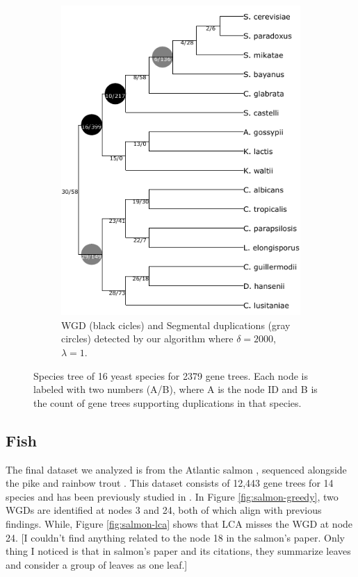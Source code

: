 \documentclass[10pt]{article}
\newcommand{\rk}[1]{\begingroup\color{red}#1\endgroup}
\begin{document}
\begin{figure}[h!]
\begin{subfigure}[b]{0.48\textwidth}
        \includegraphics[scale=0.7]{figs/fungi_greedy2000.pdf} %
        \caption{WGD (black cicles) and Segmental duplications (gray circles) detected by our algorithm where $\delta=2000$, $\lambda=1$.}
        \label{fig:fungi-greedy}
    \end{subfigure}
    
    \caption{
        Species tree of 16 yeast species for 2379 gene trees. Each node is labeled with two numbers (A/B), where A is the node ID and B is the count of gene trees supporting duplications in that species.
    }
    \label{fig:fungi}
\end{figure}


\subsection{Fish}
The final dataset we analyzed is from the Atlantic salmon \cite{lien2016atlantic}, sequenced alongside the pike \cite{rondeau2014genome} and rainbow trout \cite{berthelot2014rainbow}. This dataset consists of 12,443 gene trees for 14 species and has been previously studied in \cite{meyer20052r, danzmann2008distribution, hermansen2016extracting}. In Figure \ref{fig:salmon-greedy}, two WGDs are identified at nodes 3 and 24, both of which align with previous findings. While, Figure \ref{fig:salmon-lca} shows that LCA misses the WGD at node 24. \rk{[I couldn't find anything related to the node 18 in the salmon's paper. Only thing I noticed is that in salmon's paper and its citations, they summarize leaves and consider a group of leaves as one leaf.]} 
\end{document}
